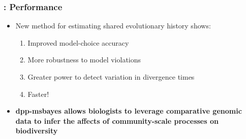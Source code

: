 

\begin{frame}
    \frametitle{\dppmsbayes: Performance}
    \begin{itemize}
        \item<1-> New method for estimating shared evolutionary history shows:
            \begin{enumerate}
                \item<1-> Improved model-choice accuracy 
                \item<1-> More robustness to model violations
                \item<1-> Greater power to detect variation in divergence times
                \item<1-> Faster!
            \end{enumerate}
        \item<2-> \textbf{dpp-msbayes allows biologists to leverage comparative
                genomic data to infer the affects of community-scale processes
                on biodiversity}
    \end{itemize}

\end{frame}
